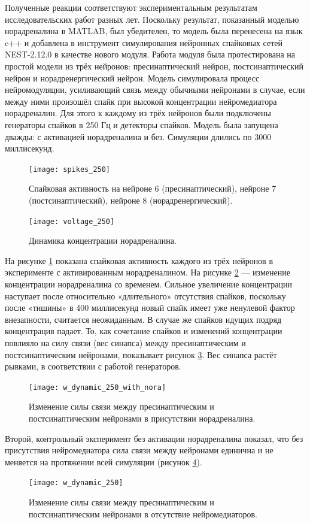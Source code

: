 Полученные реакции соответствуют экспериментальным результатам исследовательских работ разных лет.\cite{viljoen, delaneytransmission, macaca} Поскольку результат, показанный моделью норадреналина в MATLAB, был убедителен, то модель была перенесена на язык c++ и добавлена в инструмент симулирования нейронных спайковых сетей NEST-2.12.0 в качестве нового модуля. Работа модуля была протестирована на простой модели из трёх нейронов: пресинаптический нейрон, постсинаптический нейрон и норадренергический нейрон. Модель симулировала процесс нейромодуляции, усиливающий связь между обычными нейронами в случае, если между ними произошёл спайк при высокой концентрации нейромедиатора норадреналин. Для этого к каждому из трёх нейронов были подключены генераторы спайков в 250 Гц и детекторы спайков. Модель была запущена дважды: с активацией норадреналина и без. Симуляции длились по 3000 миллисекунд.


\begin{figure}
	\centering
	\texttt{[image: spikes\_250]}
	\caption{Спайковая активность на нейроне 6 (пресинаптический), нейроне 7 (постсинаптический), нейроне 8 (норадренергический).}
	\label{fig:s_250}
\end{figure}


\begin{figure}
	\centering
	\texttt{[image: voltage\_250]}
	\caption{Динамика концентрации норадреналина.}
	\label{fig:v_250}
\end{figure}


На рисунке \ref{fig:s_250} показана спайковая активность каждого из трёх нейронов в эксперименте с активированным норадреналином. На рисунке \ref{fig:v_250} — изменение концентрации норадреналина со временем. Сильное увеличение концентрации наступает после относительно «длительного» отсутствия спайков, поскольку после «тишины» в 400 миллисекунд новый спайк имеет уже ненулевой фактор внезапности, считается неожиданным. В случае же спайков идущих подряд концентрация падает. То, как сочетание спайков и изменений концентрации повлияло на силу связи (вес синапса) между пресинаптическим и постсинаптическим нейронами, показывает рисунок \ref{fig:w_250}. Вес синапса растёт рывками, в соответствии с работой генераторов.

\begin{figure}
	\centering
	\texttt{[image: w\_dynamic\_250\_with\_nora]}
	\caption{Изменение силы связи между пресинаптическим и постсинаптическим нейронами в присутствии норадреналина.}
	\label{fig:w_250}
\end{figure}

Второй, контрольный эксперимент без активации норадреналина показал, что без присутствия нейромедиатора сила связи между нейронами единична и не меняется на протяжении всей симуляции (рисунок \ref{fig:w_no_nora}).

\begin{figure}
	\centering
	\texttt{[image: w\_dynamic\_250]}
	\caption{Изменение силы связи между пресинаптическим и постсинаптическим нейронами в отсутствие нейромедиаторов.}
	\label{fig:w_no_nora}
\end{figure}